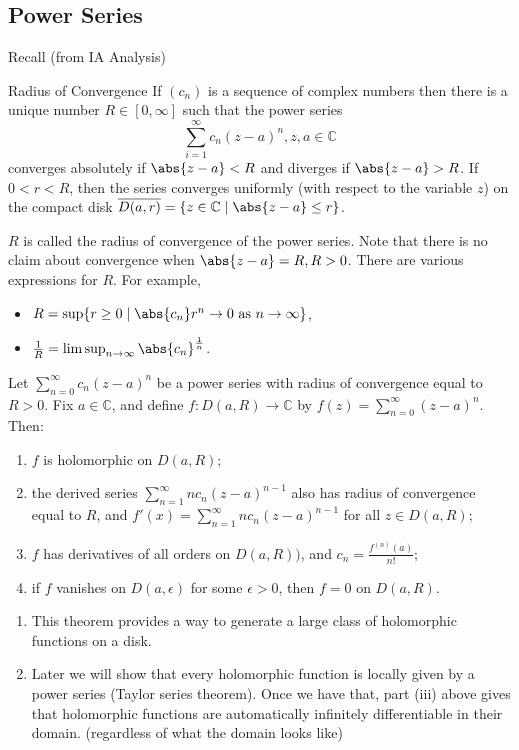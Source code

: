 \subsection{Power Series}
Recall (from IA Analysis)
\begin{theorem}{Radius of Convergence}{}
    If \((c_n)\) is a sequence of complex numbers then there is a unique number \(R \in [0, \infty]\) such that the power series
    \[
        \sum\limits_{i=1}^{\infty} c_n(z-a)^n, z,a\in\mathbb{C}
    \]
    converges absolutely if \(\abs{z - a} <R\) and diverges if \(\abs{z - a} > R\). If \(0<r<R\), then the series converges uniformly (with respect to the variable \(z\)) on the compact disk \(\overline{D(a, r)} = \{z\in\mathbb{C}\mid \abs{z - a} \leq r\}\).
\end{theorem}
\(R\) is called the radius of convergence of the power series. Note that there is no claim about convergence when \(\abs{z - a} = R, R>0\). There are various expressions for \(R\). For example,
\begin{itemize}
    \item \(R = \sup \{r \geq  0 \mid \abs{c_n} r^n \to 0 \text{ as } n \to \infty\}\),
    \item \(\frac{1}{R} = \limsup_{n\to \infty}\abs{c_n}^{\frac{1}{n}}\).
\end{itemize}
\begin{theorem}{}{}
    Let \(\sum\limits_{n=0}^{\infty} c_n(z-a)^n\) be a power series with radius of convergence equal to \(R > 0\). Fix \(a \in \mathbb{C}\), and define \(f: D(a, R) \to \mathbb{C}\) by \(f(z) = \sum\limits_{n=0}^{\infty} (z-a)^n\). Then:
    \begin{enumerate}
        \item \(f\) is holomorphic on \(D(a,R)\);
        \item the derived series \(\sum\limits_{n=1}^{\infty} nc_n (z-a)^{n-1}\) also has radius of convergence equal to \(R\), and \(f'(x) = \sum\limits_{n=1}^{\infty} nc_n(z-a)^{n-1}\) for all \(z \in D(a,R)\); 
        \item \(f\) has derivatives of all orders on \(D(a,R))\), and \(c_n = \frac{f^{(n)}(a)}{n!}\);
        \item if \(f\) vanishes on \(D(a,\epsilon)\) for some \(\epsilon >0\), then \(f = 0\) on \(D(a,R)\).
    \end{enumerate}
\end{theorem}
\begin{remark}
    \begin{enumerate}
    \item This theorem provides a way to generate a large class of holomorphic
    functions on a disk.
    \item Later we will show that every holomorphic function is locally given by a power series (Taylor series theorem). Once we have that, part (iii) above gives that holomorphic functions are automatically infinitely differentiable in their domain. (regardless of what the domain looks like)
    \end{enumerate}
\end{remark}
